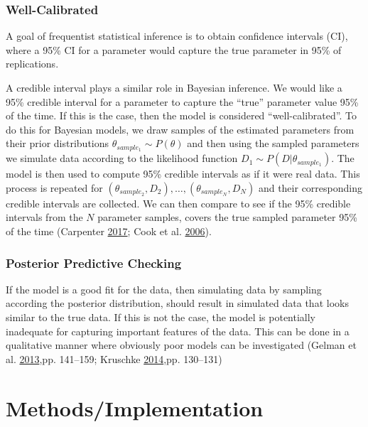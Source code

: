 \documentclass[11pt,a4paper]{article}
\begin{document}
\hypertarget{well-calibrated}{%
\subsubsection{Well-Calibrated}\label{well-calibrated}}

A goal of frequentist statistical inference is to obtain confidence
intervals (CI), where a 95\% CI for a parameter would capture the true
parameter in 95\% of replications.

A credible interval plays a similar role in Bayesian inference. We would
like a 95\% credible interval for a parameter to capture the ``true''
parameter value 95\% of the time. If this is the case, then the model is
considered ``well-calibrated''. To do this for Bayesian models, we draw
samples of the estimated parameters from their prior distributions
\(\theta_{sample_1} \sim P(\theta)\) and then using the sampled
parameters we simulate data according to the likelihood function
\(D_{1} \sim P(D|\theta_{sample_1})\). The model is then used to compute
95\% credible intervals as if it were real data. This process is
repeated for
\((\theta_{sample_2}, D_2), \dots, (\theta_{sample_N}, D_N)\) and their
corresponding credible intervals are collected. We can then compare to
see if the 95\% credible intervals from the \(N\) parameter samples,
covers the true sampled parameter 95\% of the time (Carpenter
\protect\hyperlink{ref-carpenter_bayesian_2017}{2017}; Cook et al.
\protect\hyperlink{ref-cook_validation_2006}{2006}).

\hypertarget{posterior-predictive-checking}{%
\subsubsection{Posterior Predictive
Checking}\label{posterior-predictive-checking}}

If the model is a good fit for the data, then simulating data by
sampling according the posterior distribution, should result in
simulated data that looks similar to the true data. If this is not the
case, the model is potentially inadequate for capturing important
features of the data. This can be done in a qualitative manner where
obviously poor models can be investigated (Gelman et al.
\protect\hyperlink{ref-gelman_bayesian_2013}{2013},pp. 141--159;
Kruschke \protect\hyperlink{ref-kruschke_doing_2014}{2014},pp. 130--131)

\hypertarget{methods}{%
\section{Methods/Implementation}\label{methods}}
\end{document}
